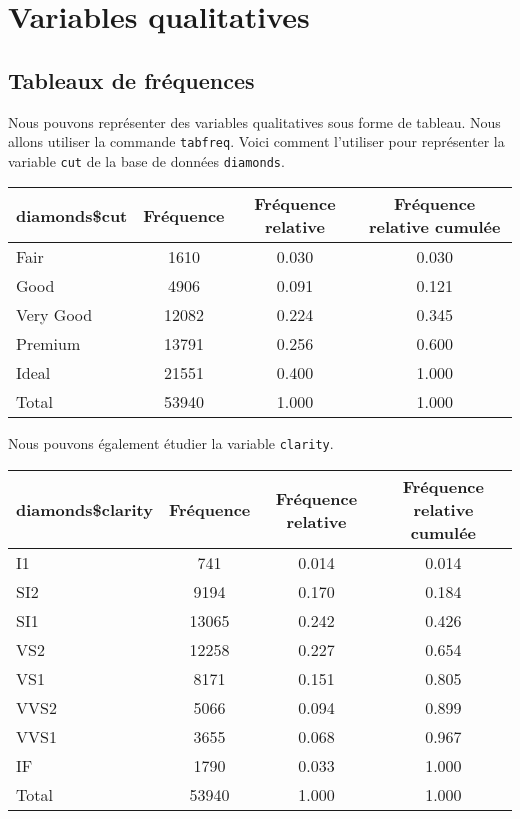 \documentclass[]{book}
\newenvironment{Shaded}{\begin{snugshade}}{\end{snugshade}}
\newcommand{\KeywordTok}[1]{\textcolor[rgb]{0.13,0.29,0.53}{\textbf{#1}}}
\newcommand{\OperatorTok}[1]{\textcolor[rgb]{0.81,0.36,0.00}{\textbf{#1}}}
\newcommand{\NormalTok}[1]{#1}
\begin{document}
\section{Variables qualitatives}\label{variables-qualitatives-1}

\subsection{Tableaux de fréquences}\label{tableaux-de-frequences}

Nous pouvons représenter des variables qualitatives sous forme de
tableau. Nous allons utiliser la commande \texttt{tabfreq}. Voici
comment l'utiliser pour représenter la variable \texttt{cut} de la base
de données \texttt{diamonds}.

\begin{Shaded}
\end{Shaded}

\begin{tabular}{l|c|c|c}
\hline
diamonds\$cut & Fréquence & Fréquence relative & Fréquence relative cumulée\\
\hline
Fair & 1610 & 0.030 & 0.030\\
\hline
Good & 4906 & 0.091 & 0.121\\
\hline
Very Good & 12082 & 0.224 & 0.345\\
\hline
Premium & 13791 & 0.256 & 0.600\\
\hline
Ideal & 21551 & 0.400 & 1.000\\
\hline
Total & 53940 & 1.000 & 1.000\\
\hline
\end{tabular}

Nous pouvons également étudier la variable \texttt{clarity}.

\begin{Shaded}
\end{Shaded}

\begin{tabular}{l|c|c|c}
\hline
diamonds\$clarity & Fréquence & Fréquence relative & Fréquence relative cumulée\\
\hline
I1 & 741 & 0.014 & 0.014\\
\hline
SI2 & 9194 & 0.170 & 0.184\\
\hline
SI1 & 13065 & 0.242 & 0.426\\
\hline
VS2 & 12258 & 0.227 & 0.654\\
\hline
VS1 & 8171 & 0.151 & 0.805\\
\hline
VVS2 & 5066 & 0.094 & 0.899\\
\hline
VVS1 & 3655 & 0.068 & 0.967\\
\hline
IF & 1790 & 0.033 & 1.000\\
\hline
Total & 53940 & 1.000 & 1.000\\
\hline
\end{tabular}
\end{document}
